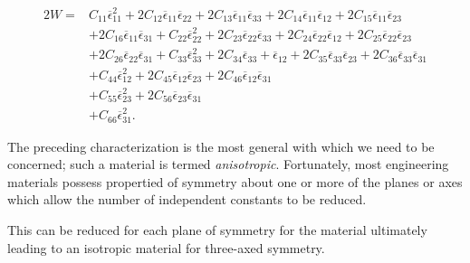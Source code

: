 \begin{align*}
  2W =& C_{11} \overline{\epsilon}_{11}^2 + 2C_{12} \overline{\epsilon}_{11} \overline{\epsilon}_{22} + 2C_{13} \overline{\epsilon}_{11} \overline{\epsilon}_{33} + 2C_{14} \overline{\epsilon}_{11} \overline{\epsilon}_{12} + 2C_{15} \overline{\epsilon}_{11} \overline{\epsilon}_{23} \\
      &+ 2C_{16} \overline{\epsilon}_{11} \overline{\epsilon}_{31} + C_{22} \overline{\epsilon}_{22}^2 + 2C_{23} \overline{\epsilon}_{22} \overline{\epsilon}_{33} + 2C_{24} \overline{\epsilon}_{22} \overline{\epsilon}_{12} + 2C_{25} \overline{\epsilon}_{22} \overline{\epsilon}_{23} \\
      &+ 2C_{26} \overline{\epsilon}_{22} \overline{\epsilon}_{31} + C_{33} \overline{\epsilon}_{33}^2 + 2C_{34} \overline{\epsilon}_{33} + \overline{\epsilon}_{12} + 2C_{35} \overline{\epsilon}_{33} \overline{\epsilon}_{23} + 2C_{36} \overline{\epsilon}_{33} \overline{\epsilon}_{31} \\
      &+ C_{44}\overline{\epsilon}_{12}^2 + 2C_{45}\overline{\epsilon}_{12} \overline{\epsilon}_{23} + 2C_{46} \overline{\epsilon}_{12} \overline{\epsilon}_{31} \\
      &+ C_{55} \overline{\epsilon}_{23}^2 + 2C_{56} \overline{\epsilon}_{23} \overline{\epsilon}_{31} \\
      &+ C_{66} \overline{\epsilon}_{31}^2
.\end{align*}

The preceding characterization is the most general with which we need to be concerned; such a material is termed \textit{anisotropic}.
Fortunately, most engineering materials possess propertied of symmetry about one or more of the planes or axes which allow the number of independent constants to be reduced.

This can be reduced for each plane of symmetry for the material ultimately leading to an isotropic material for three-axed symmetry. 

